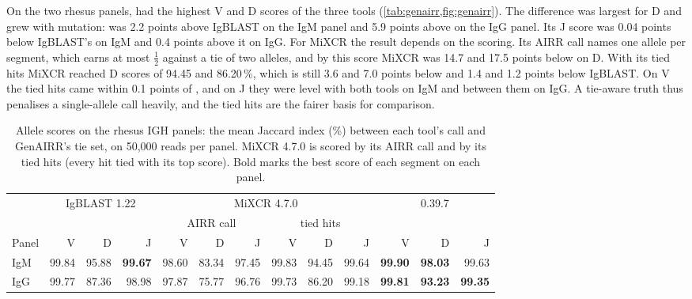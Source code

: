 \documentclass[11pt,a4paper]{article}
\begin{document}
On the two rhesus panels, \swig{} had the highest V and D scores of the
three tools (\cref{tab:genairr,fig:genairr}). The difference was largest for
D and grew with mutation: \swig{} was 2.2 points above IgBLAST on the IgM
panel and 5.9 points above on the IgG panel. Its J score was 0.04 points
below IgBLAST's on IgM and 0.4 points above it on IgG. For MiXCR the result
depends on the scoring. Its AIRR call names one allele per segment, which
earns at most $\tfrac12$ against a tie of two alleles, and by this score
MiXCR was 14.7 and 17.5 points below \swig{} on D. With its tied hits MiXCR
reached D scores of 94.45 and 86.20\,\%, which is still 3.6 and 7.0 points
below \swig{} and 1.4 and 1.2 points below IgBLAST. On V the tied hits came
within 0.1 points of \swig, and on J they were level with both tools on IgM
and between them on IgG. A tie-aware truth thus penalises a single-allele
call heavily, and the tied hits are the fairer basis for comparison.

\begin{table}[tbp]
\centering
\caption{Allele scores on the rhesus IGH panels: the mean Jaccard index (\%)
between each tool's call and GenAIRR's tie set, on 50,000 reads per panel.
MiXCR 4.7.0 is scored by its AIRR call and by its tied hits (every hit tied
with its top score). Bold marks the best score of each segment on each
panel.}
\label{tab:genairr}
\footnotesize
\setlength{\tabcolsep}{3pt}
\begin{tabular}{@{}l rrr rrr rrr rrr@{}}
\toprule
 & \multicolumn{3}{c}{IgBLAST 1.22} & \multicolumn{6}{c}{MiXCR 4.7.0} & \multicolumn{3}{c}{\swig{} 0.39.7} \\
 & & & & \multicolumn{3}{c}{AIRR call} & \multicolumn{3}{c}{tied hits} & & & \\
\cmidrule(lr){2-4}\cmidrule(lr){5-7}\cmidrule(lr){8-10}\cmidrule(l){11-13}
Panel & V & D & J & V & D & J & V & D & J & V & D & J \\
\midrule
IgM & 99.84 & 95.88 & \textbf{99.67} & 98.60 & 83.34 & 97.45 & 99.83 & 94.45 & 99.64 & \textbf{99.90} & \textbf{98.03} & 99.63 \\
IgG & 99.77 & 87.36 & 98.98 & 97.87 & 75.77 & 96.76 & 99.73 & 86.20 & 99.18 & \textbf{99.81} & \textbf{93.23} & \textbf{99.35} \\
\bottomrule
\end{tabular}
\end{table}
\end{document}
